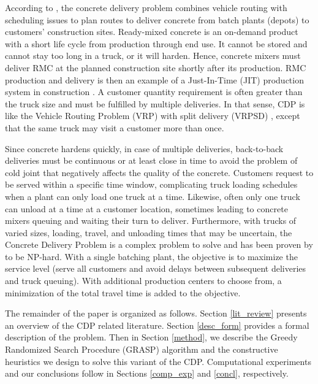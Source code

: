 \documentclass{article}
\begin{document}
{According to \cite{blazewicz2019handbook}, the concrete delivery problem combines vehicle routing with scheduling issues to plan routes to deliver concrete from batch plants (depots) to customers' construction sites. Ready-mixed concrete is an on-demand product with a short life cycle from production through end use. It cannot be stored and cannot stay too long in a truck, or it will harden. Hence, concrete mixers must deliver RMC at the planned construction site shortly after its production. RMC production and delivery is then an example of a Just-In-Time (JIT) production system in construction \citep{tommelein1999just}. A customer quantity requirement is often greater than the truck size and must be fulfilled by multiple deliveries. In that sense, CDP is like the Vehicle Routing Problem (VRP) with split delivery (VRPSD) \citep{archetti2008split}, except that the same truck may visit a customer more than once. 

Since concrete hardens quickly, in case of multiple deliveries, back-to-back deliveries must be continuous or at least close in time to avoid the problem of cold joint that negatively affects the quality of the concrete. Customers request to be served within a specific time window, complicating truck loading schedules when a plant can only load one truck at a time. Likewise, often only one truck can unload at a time at a customer location, sometimes leading to concrete mixers queuing and waiting their turn to deliver. Furthermore, with trucks of varied sizes, loading, travel, and unloading times that may be uncertain, the Concrete Delivery Problem is a complex problem to solve and has been proven by \cite{asbach2009analysis} to be NP-hard. With a single batching plant, the objective is to maximize the service level (serve all customers and avoid delays between subsequent deliveries and truck queuing). With additional production centers to choose from, a minimization of the total travel time is added to the objective. %

The remainder of the paper is organized as follows. Section \ref{lit_review} presents an overview of the CDP related literature.  Section \ref{desc_form} provides a formal description of the problem. Then in Section \ref{method}, we describe the Greedy Randomized Search Procedure (GRASP) algorithm and the constructive heuristics we design to solve this variant of the CDP. Computational experiments and our conclusions follow in Sections \ref{comp_exp} and \ref{concl}, respectively. 

}
\end{document}
